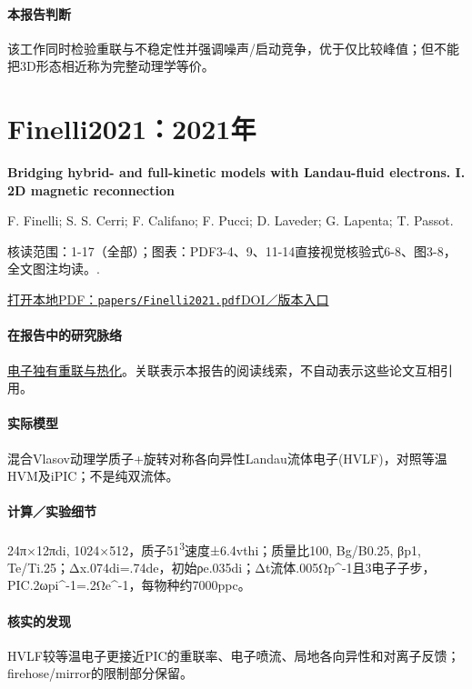 \documentclass[UTF8,a4paper,11pt,openany,fontset=fandol]{ctexbook}
\begin{document}
\paragraph{本报告判断}该工作同时检验重联与不稳定性并强调噪声/启动竞争，优于仅比较峰值；但不能把3D形态相近称为完整动理学等价。

\section{Finelli2021：2021年}\label{paper:Finelli2021}

\textbf{Bridging hybrid- and full-kinetic models with Landau-fluid electrons. I. 2D magnetic reconnection}\citep{Finelli2021}\

F. Finelli;  S. S. Cerri;  F. Califano;  F. Pucci;  D. Laveder;  G. Lapenta;  T. Passot.

\textsf{核读范围：}1-17（全部）；\textsf{图表：}PDF3-4、9、11-14直接视觉核验式6-8、图3-8，全文图注均读。.

\href{run:../papers/Finelli2021.pdf}{打开本地PDF：\texttt{papers/Finelli2021.pdf}}\quad\href{https://doi.org/10.1051/0004-6361/202140279}{DOI／版本入口}

\paragraph{在报告中的研究脉络}\hyperref[story:energy]{电子独有重联与热化}。关联表示本报告的阅读线索，不自动表示这些论文互相引用。

\paragraph{实际模型}混合Vlasov动理学质子+旋转对称各向异性Landau流体电子(HVLF)，对照等温HVM及iPIC；不是纯双流体。

\paragraph{计算／实验细节}24π×12πdi, 1024×512，质子51\textsuperscript{3}速度±6.4vthi；质量比100, Bg/B0.25, βp1, Te/Ti.25；Δx.074di=.74de，初始ρe.035di；Δt流体.005Ωp\textasciicircum{}-1且3电子子步，PIC.2ωpi\textasciicircum{}-1=.2Ωe\textasciicircum{}-1，每物种约7000ppc。

\paragraph{核实的发现}HVLF较等温电子更接近PIC的重联率、电子喷流、局地各向异性和对离子反馈；firehose/mirror的限制部分保留。
\end{document}
